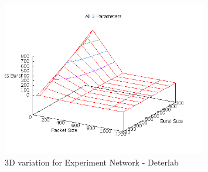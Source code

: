 \documentclass[11pt]{article}
\begin{document}
\FloatBarrier
\begin{figure}[!ht]
\centering
\includegraphics[width=0.8\textwidth]{exp.png}
\caption{3D variation for Experiment Network - Deterlab}
\end{figure}
\FloatBarrier
\end{document}
